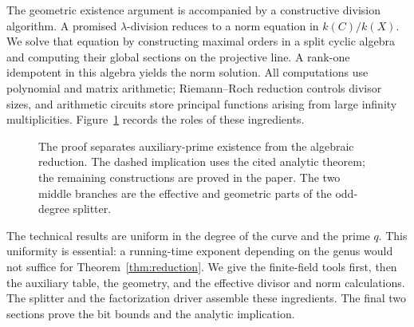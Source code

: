 The geometric existence argument is accompanied by a constructive
division algorithm. A promised $\lambda$-division reduces to a norm
equation in $k(C)/k(X)$. We solve that equation by constructing maximal
orders in a split cyclic algebra and computing their global sections
on the projective line. A rank-one idempotent in this algebra yields
the norm solution. All computations use polynomial and matrix arithmetic;
Riemann--Roch reduction controls divisor sizes, and arithmetic circuits
store principal functions arising from large infinity multiplicities.
Figure~\ref{fig:route} records the roles of these ingredients.

\begin{figure}[t]
\centering
{}
\caption{The proof separates auxiliary-prime existence from the algebraic
reduction. The dashed implication uses the cited analytic theorem;
the remaining constructions are proved in the paper. The two middle
branches are the effective and geometric parts of the odd-degree splitter.}
\label{fig:route}
\end{figure}

The technical results are uniform in the degree of the curve and the
prime $q$. This uniformity is essential: a running-time exponent depending
on the genus would not suffice for Theorem~\ref{thm:reduction}.
We give the finite-field tools first, then the auxiliary table, the
geometry, and the effective divisor and norm calculations. The splitter
and the factorization driver assemble these ingredients. The final two
sections prove the bit bounds and the analytic implication.
